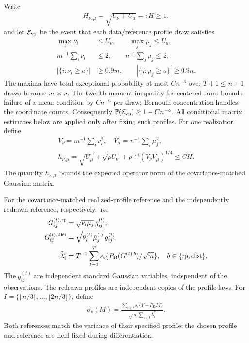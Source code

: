 \documentclass[numsec,webpdf,modern,large,namedate]{oup-authoring-template}
\theoremstyle{plain}
\theoremstyle{remark}
\newcommand{\bOmega}{\bm{\Omega}}
\newif\ifmarkchanges
\newenvironment{revision}{\begingroup\ifmarkchanges\color{red}\fi}{\endgroup}
\begin{document}
\begin{revision}
Write
\begin{align}
 H_{\nu,\mu}=\sqrt{U_\nu+U_\mu}=:H\ge1,
 \label{eq:vp_heterogeneity_scale}
\end{align}
and let $\mathcal E_{\rm vp}$ be the event that each data/reference
profile draw satisfies
\begin{align}
 \max_i\nu_i&\le U_\nu,\qquad \max_j\mu_j\le U_\mu,\nonumber\\
 m^{-1}\sum_i\nu_i&\le2,\qquad n^{-1}\sum_j\mu_j\le2,\nonumber\\
 |\{i:\nu_i\ge a\}|&\ge0.9m,\qquad |\{j:\mu_j\ge a\}|\ge0.9n.
 \label{eq:vp_profile_event}
\end{align}
The maxima have total exceptional probability at most $Cn^{-3}$ over
$T+1\le n+1$ draws because $m\asymp n$.
The twelfth-moment inequality for centered sums bounds failure of a mean
condition by $Cn^{-6}$ per draw; Bernoulli concentration handles the
coordinate counts.  Consequently $\mathbb P(\mathcal E_{\rm vp})
\ge1-Cn^{-3}$.  All conditional matrix estimates below are applied only
after fixing such profiles.
For one realization define
\begin{align}
 V_\nu=m^{-1}\sum_i\nu_i^2,\quad V_\mu=n^{-1}\sum_j\mu_j^2,
 \label{eq:vp_V_definition}\\
 h_{\nu,\mu}=\sqrt{U_\mu}+\sqrt{\rho U_\nu}
               +\rho^{1/4}(V_\nu V_\mu)^{1/4}\le CH.
 \label{eq:vp_edge_factor}
\end{align}
The quantity $h_{\nu,\mu}$ bounds the expected operator norm of the
covariance-matched Gaussian matrix.

For the covariance-matched realized-profile reference and the independently
redrawn reference, respectively, use
\begin{align}
 G_{ij}^{(t),\rm rp}&=\sqrt{\nu_i\mu_j}\,g_{ij}^{(t)},
 \label{eq:vp_gaussian_realized}\\
 G_{ij}^{(t),\rm dist}&=\sqrt{\bar\nu_i^{(t)}\bar\mu_j^{(t)}}\,g_{ij}^{(t)},
 \label{eq:vp_distribution_reference}\\
 \widehat\lambda_i^b&=T^{-1}\sum_{t=1}^T
        s_i\{P_{\bOmega}(G^{(t),b})/\sqrt m\},
        \quad b\in\{{\rm rp},{\rm dist}\}.
 \label{eq:vp_realized_reference}
\end{align}
The $g_{ij}^{(t)}$ are independent standard Gaussian variables, independent
of the observations.  The redrawn profiles are independent copies of the
profile laws.  For $I=\{\lceil n/3\rceil,\ldots,\lfloor2n/3\rfloor\}$,
define
\begin{align}
 \widehat\sigma_b(M)=
 \frac{\sum_{i\in I}s_i\{Y-P_{\bOmega}M\}}
      {\sqrt m\sum_{i\in I}\widehat\lambda_i^b}.
 \label{eq:vp_working_scale_general}
\end{align}
Both references match the variance of their specified profile; the chosen
profile and reference are held fixed during differentiation.



\end{revision}
\end{document}
